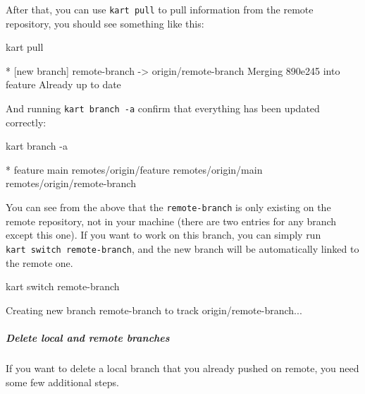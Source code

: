 \documentclass[
  letterpaper,
  DIV=11,
  numbers=noendperiod]{scrartcl}
\let\oldsubparagraph\subparagraph
\renewcommand{\subparagraph}[1]{\oldsubparagraph{#1}\mbox{}}
\newenvironment{Shaded}{\begin{snugshade}}{\end{snugshade}}
\newcommand{\AttributeTok}[1]{\textcolor[rgb]{1.00,0.47,0.78}{#1}}
\newcommand{\ExtensionTok}[1]{\textcolor[rgb]{0.55,0.91,0.99}{#1}}
\newcommand{\NormalTok}[1]{\textcolor[rgb]{0.97,0.97,0.95}{#1}}
\newcommand{\OperatorTok}[1]{\textcolor[rgb]{0.97,0.97,0.95}{#1}}
\newcommand{\StringTok}[1]{\textcolor[rgb]{0.95,0.98,0.55}{#1}}
\begin{document}
After that, you can use \texttt{kart\ pull} to pull information from the
remote repository, you should see something like this:

\begin{Shaded}
\begin{Highlighting}[]
\ExtensionTok{kart}\NormalTok{ pull}

 \ExtensionTok{*}\NormalTok{ [new branch]      remote{-}branch }\AttributeTok{{-}}\OperatorTok{\textgreater{}}\NormalTok{ origin/remote{-}branch}
\ExtensionTok{Merging}\NormalTok{ 890e245 into feature}
\ExtensionTok{Already}\NormalTok{ up to date}
\end{Highlighting}
\end{Shaded}

And running \texttt{kart\ branch\ -a} confirm that everything has been
updated correctly:

\begin{Shaded}
\begin{Highlighting}[]
\ExtensionTok{kart}\NormalTok{ branch }\AttributeTok{{-}a}

\ExtensionTok{*}\NormalTok{ feature}
  \ExtensionTok{main}
  \ExtensionTok{remotes/origin/feature}
  \ExtensionTok{remotes/origin/main}
  \ExtensionTok{remotes/origin/remote{-}branch}
\end{Highlighting}
\end{Shaded}

You can see from the above that the \texttt{remote-branch} is only
existing on the remote repository, not in your machine (there are two
entries for any branch except this one). If you want to work on this
branch, you can simply run \texttt{kart\ switch\ remote-branch}, and the
new branch will be automatically linked to the remote one.

\begin{Shaded}
\begin{Highlighting}[]
\ExtensionTok{kart}\NormalTok{ switch remote{-}branch}

\ExtensionTok{Creating}\NormalTok{ new branch }\StringTok{\textquotesingle{}remote{-}branch\textquotesingle{}}\NormalTok{ to track }\StringTok{\textquotesingle{}origin/remote{-}branch\textquotesingle{}}\NormalTok{...}
\end{Highlighting}
\end{Shaded}

\subparagraph{Delete local and remote
branches}\label{delete-local-and-remote-branches}

If you want to delete a local branch that you already pushed on remote,
you need some few additional steps.
\end{document}
